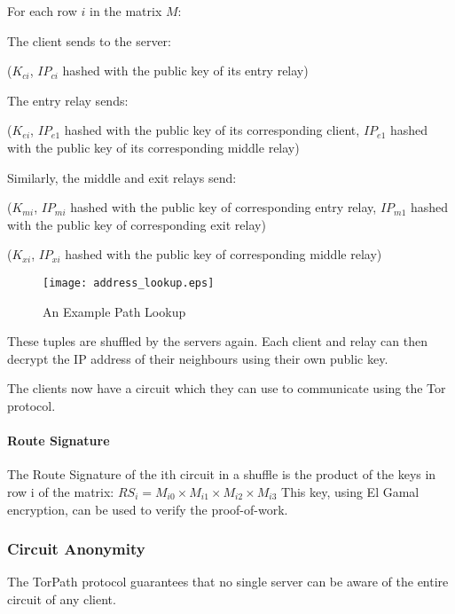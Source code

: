 For each row $i$ in the matrix $M$:

The client sends to the server:

($K_{ci}$, {$IP_{ci}$ hashed with the public key of its entry relay})

The entry relay sends:

($K_{ei}$, {$IP_{e1}$ hashed with the public key of its corresponding client}, 
{$IP_{e1}$ hashed with the public key of its corresponding middle relay})

Similarly, the middle and exit relays send:

($K_{mi}$, {$IP_{mi}$ hashed with the public key of corresponding entry relay}, 
{$IP_{m1}$ hashed with the public key of corresponding exit relay})

($K_{xi}$, {$IP_{xi}$ hashed with the public key of corresponding middle relay})

\begin{figure}
  \centering
    \texttt{[image: address\_lookup.eps]}
  \caption{An Example Path Lookup}
\end{figure}

These tuples are shuffled by the servers again. Each client and relay can then 
decrypt the IP address of their neighbours using their own public key.

The clients now have a circuit which they can use to communicate using the Tor 
protocol.

\paragraph{Route Signature}
The Route Signature of the ith circuit in a shuffle is the product of the keys
in row i of the matrix:
$RS_i = M_{i0} \times M_{i1} \times M_{i2} \times M_{i3}$
This key, using El Gamal encryption, can be used to verify the  proof-of-work.

\subsubsection{Circuit Anonymity} 
The TorPath protocol guarantees that no single server can be aware of the entire
circuit of any client. 




